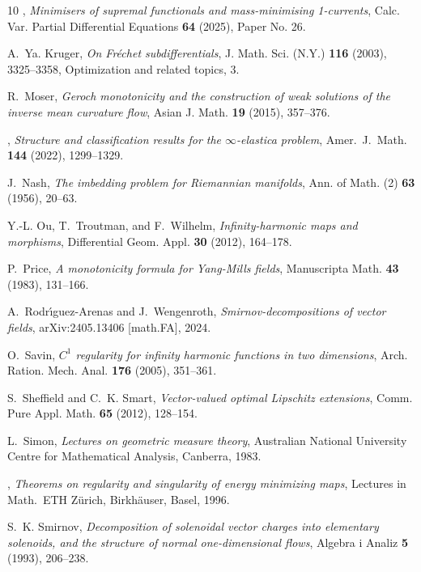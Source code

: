 \documentclass[a4paper]{article}
\theoremstyle{definition}
\theoremstyle{remark}
\begin{document}
\begin{thebibliography}{10}
\bysame, \emph{Minimisers of supremal functionals and mass-minimising
  1-currents}, Calc. Var. Partial Differential Equations \textbf{64} (2025),
  Paper No. 26.

A.~Ya. Kruger, \emph{On {F}r\'echet subdifferentials}, J. Math. Sci. (N.Y.)
  \textbf{116} (2003), 3325--3358, Optimization and related topics, 3.

R.~Moser, \emph{Geroch monotonicity and the construction of weak solutions of
  the inverse mean curvature flow}, Asian J. Math. \textbf{19} (2015),
  357--376.

\bysame, \emph{Structure and classification results for the $\infty$-elastica
  problem}, Amer.\ J.\ Math. \textbf{144} (2022), 1299--1329.

J.~Nash, \emph{The imbedding problem for {R}iemannian manifolds}, Ann. of Math.
  (2) \textbf{63} (1956), 20--63.

Y.-L. Ou, T.~Troutman, and F.~Wilhelm, \emph{Infinity-harmonic maps and
  morphisms}, Differential Geom. Appl. \textbf{30} (2012), 164--178.

P.~Price, \emph{A monotonicity formula for {Y}ang-{M}ills fields}, Manuscripta
  Math. \textbf{43} (1983), 131--166.

A.~Rodr{\'\i}guez-Arenas and J.~Wengenroth, \emph{Smirnov-decompositions of
  vector fields}, arXiv:2405.13406 [math.FA], 2024.

O.~Savin, \emph{{$C^1$} regularity for infinity harmonic functions in two
  dimensions}, Arch. Ration. Mech. Anal. \textbf{176} (2005), 351--361.

S.~Sheffield and C.~K. Smart, \emph{Vector-valued optimal {L}ipschitz
  extensions}, Comm. Pure Appl. Math. \textbf{65} (2012), 128--154.

L.~Simon, \emph{Lectures on geometric measure theory}, Australian National
  University Centre for Mathematical Analysis, Canberra, 1983.

\bysame, \emph{Theorems on regularity and singularity of energy minimizing
  maps}, Lectures in Math.~ETH Z\"urich, Birkh\"auser, Basel, 1996.

S.~K. Smirnov, \emph{Decomposition of solenoidal vector charges into elementary
  solenoids, and the structure of normal one-dimensional flows}, Algebra i
  Analiz \textbf{5} (1993), 206--238.


\end{thebibliography}
\end{document}
